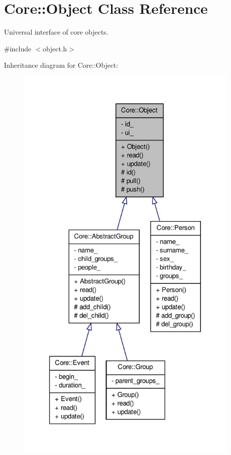 \hypertarget{classCore_1_1Object}{
\section{Core::Object Class Reference}
\label{dc/dc7/classCore_1_1Object}
}


Universal interface of core objects.  




{\ttfamily \#include $<$object.h$>$}



Inheritance diagram for Core::Object:
\nopagebreak
\begin{figure}[H]
\begin{center}
\leavevmode
\includegraphics[width=309pt]{d7/d01/classCore_1_1Object__inherit__graph}
\end{center}
\end{figure}


